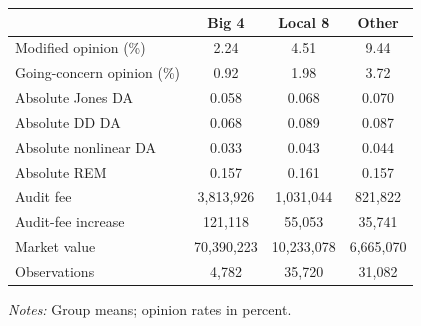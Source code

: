 \documentclass[10pt]{article}
\newcommand{\sym}[1]{\textsuperscript{#1}}
\begin{document}
\begin{minipage}{19cm}\fontsize{10}{12}\selectfont\setlength{\tabcolsep}{4pt}\renewcommand{\arraystretch}{1.15}


\def\sym#1{\ifmmode^{#1}\else\(^{#1}\)\fi}
\centering
{}
\label{tab:big4-other-outcomes-descriptive}
\begin{threeparttable}
\begin{tabular}{l c c c }
\toprule
 & Big 4 & Local 8 & Other \\
\midrule
Modified opinion (\%) & 2.24 & 4.51 & 9.44 \\
Going-concern opinion (\%) & 0.92 & 1.98 & 3.72 \\
Absolute Jones DA & 0.058 & 0.068 & 0.070 \\
Absolute DD DA & 0.068 & 0.089 & 0.087 \\
Absolute nonlinear DA & 0.033 & 0.043 & 0.044 \\
Absolute REM & 0.157 & 0.161 & 0.157 \\
Audit fee & 3,813,926 & 1,031,044 & 821,822 \\
Audit-fee increase & 121,118 & 55,053 & 35,741 \\
Market value & 70,390,223 & 10,233,078 & 6,665,070 \\
Observations & 4,782 & 35,720 & 31,082 \\
\bottomrule
\end{tabular}
\begin{tablenotes}\fontsize{9}{11}\selectfont
\item \raggedright \fontsize{9}{11}\selectfont \textit{Notes:} Group means; opinion rates in percent.
\end{tablenotes}
\end{threeparttable}

\end{minipage}
\end{document}
